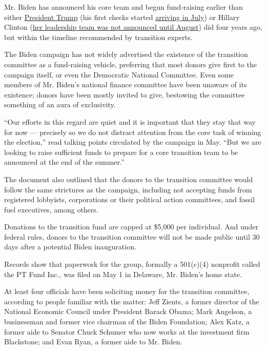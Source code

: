 Mr. Biden has announced his core team and begun fund-raising earlier
than either
\href{https://www.nytimes3xbfgragh.onion/interactive/2020/us/elections/donald-trump.html}{President
Trump} (his first checks started
\href{https://publicintegrity.org/politics/billionaires-and-corporations-helped-fund-donald-trumps-transition/}{arriving
in July}) or Hillary Clinton
(\href{https://www.nytimes3xbfgragh.onion/2016/08/16/us/politics/hillary-clinton-transition-team.html}{her
leadership team was not announced until August}) did four years ago, but
within the timeline recommended by transition experts.

The Biden campaign has not widely advertised the existence of the
transition committee as a fund-raising vehicle, preferring that most
donors give first to the campaign itself, or even the Democratic
National Committee. Even some members of Mr. Biden's national finance
committee have been unaware of its existence; donors have been mostly
invited to give, bestowing the committee something of an aura of
exclusivity.

``Our efforts in this regard are quiet and it is important that they
stay that way for now --- precisely so we do not distract attention from
the core task of winning the election,'' read talking points circulated
by the campaign in May. ``But we are looking to raise sufficient funds
to prepare for a core transition team to be announced at the end of the
summer.''

The document also outlined that the donors to the transition committee
would follow the same strictures as the campaign, including not
accepting funds from registered lobbyists, corporations or their
political action committees, and fossil fuel executives, among others.

Donations to the transition fund are capped at \$5,000 per individual.
And under federal rules, donors to the transition committee will not be
made public until 30 days after a potential Biden inauguration.

Records show that paperwork for the group, formally a 501(c)(4)
nonprofit called the PT Fund Inc., was filed on May 1 in Delaware, Mr.
Biden's home state.

At least four officials have been soliciting money for the transition
committee, according to people familiar with the matter: Jeff Zients, a
former director of the National Economic Council under President Barack
Obama; Mark Angelson, a businessman and former vice chairman of the
Biden Foundation; Alex Katz, a former aide to Senator Chuck Schumer who
now works at the investment firm Blackstone; and Evan Ryan, a former
aide to Mr. Biden.

